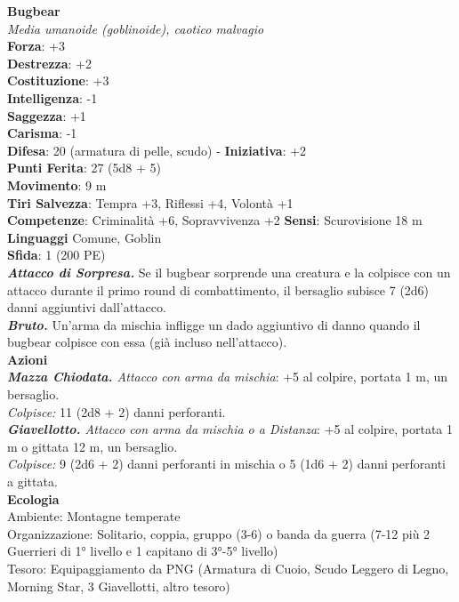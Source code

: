 \begin{multicols}{2}
\medskip\textbf{Bugbear}\\
\emph{Media umanoide (goblinoide), caotico malvagio}\\
\textbf{Forza}: +3\\
\textbf{Destrezza}: +2\\
\textbf{Costituzione}: +3\\
\textbf{Intelligenza}: -1\\
\textbf{Saggezza}: +1\\
\textbf{Carisma}: -1\\
\textbf{Difesa}: 20 (armatura di pelle, scudo) - \textbf{Iniziativa}: +2\\
\textbf{Punti Ferita}: 27 (5d8 + 5)\\
\textbf{Movimento}: 9 m\\
\textbf{Tiri Salvezza}: Tempra +3, Riflessi +4, Volontà +1\\
\textbf{Competenze}: Criminalità +6, Sopravvivenza +2
\textbf{Sensi}: Scurovisione 18 m \\
\textbf{Linguaggi} Comune, Goblin\\
\textbf{Sfida}: 1 (200 PE)\smallskip\\
\emph{\textbf{Attacco di Sorpresa.}} Se il bugbear sorprende una creatura e la colpisce con un attacco durante il primo round di combattimento, il bersaglio subisce 7 (2d6) danni aggiuntivi dall'attacco.\\
\emph{\textbf{Bruto.}} Un'arma da mischia infligge un dado aggiuntivo di danno quando il bugbear colpisce con essa (già incluso nell'attacco).\\
\smallskip\textbf{Azioni}\\
\emph{\textbf{Mazza Chiodata.} Attacco con arma da mischia}: +5 al colpire, portata 1 m, un bersaglio.\\
\emph{Colpisce:} 11 (2d8 + 2) danni perforanti.\\
\emph{\textbf{Giavellotto.} Attacco con arma da mischia o a Distanza}: +5 al colpire, portata 1 m o gittata 12 m, un bersaglio.\\
\emph{Colpisce:} 9 (2d6 + 2) danni perforanti in mischia o 5 (1d6 + 2) danni perforanti a gittata.\\
\textbf{Ecologia}\\
Ambiente: Montagne temperate\\
Organizzazione: Solitario, coppia, gruppo (3-6) o banda da guerra (7-12 più 2 Guerrieri di 1° livello e 1 capitano di 3°-5° livello)\\
Tesoro: Equipaggiamento da PNG (Armatura di Cuoio, Scudo Leggero di Legno, Morning Star, 3 Giavellotti, altro tesoro)\\

\end{multicols}
